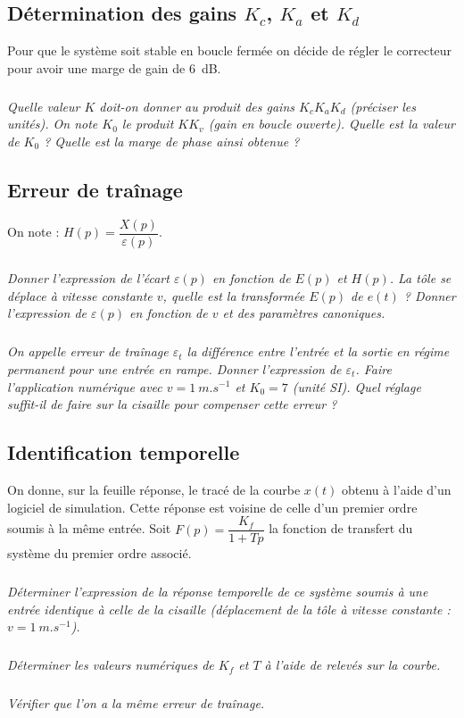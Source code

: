 \documentclass[10pt,fleqn]{article} %
\begin{document}
\begin{multicols}{2}
\subsection*{Détermination des gains $K_c$, $K_a$ et $K_d$}
Pour que le système soit stable en boucle fermée on décide de régler le correcteur pour avoir une marge de gain de \SI{6}{dB}.

\subparagraph{}\textit{Quelle valeur $K$ doit-on donner au produit des gains $K_c K_a K_d$ (préciser les unités).
On note $K_0$ le produit $KK_v$ (gain en boucle ouverte). Quelle est la valeur de $K_0$ ?
Quelle est la marge de phase ainsi obtenue ?}


\subsection*{Erreur de traînage}
On note :   $H(p)=\dfrac{X(p)}{\varepsilon(p)}$.

\subparagraph{}\textit{Donner l’expression de l’écart $\varepsilon(p)$ en fonction de $E(p)$ et $H(p)$. La tôle se déplace à vitesse constante $v$, quelle est la transformée $E(p)$ de $e(t)$ ? Donner l’expression de $\varepsilon(p)$ en fonction de $v$ et des paramètres canoniques.}

\subparagraph{}\textit{On appelle erreur de traînage $\varepsilon_t$ la différence entre l’entrée et la sortie en régime permanent pour une entrée en rampe. Donner l’expression de $\varepsilon_t$. Faire l’application numérique avec $v = \SI{1}{m.s^{-1}}$ et $K_0 = 7$ (unité SI).	
Quel réglage suffit-il de faire sur la cisaille pour compenser cette erreur ?}


\subsection*{Identification temporelle}
On donne, sur la feuille réponse, le tracé de la courbe $x(t)$ obtenu à l’aide d’un logiciel de simulation.
Cette réponse est voisine de celle d’un premier ordre soumis à la même entrée.
Soit $F(p)=\dfrac{K_f}{1+Tp}$ la fonction de transfert du système du premier ordre associé.

\subparagraph{}\textit{Déterminer l’expression de la réponse temporelle de ce système soumis à une entrée identique à celle de la cisaille (déplacement de la tôle à vitesse constante : $v = \SI{1}{m.s^{-1}}$).}

\subparagraph{}\textit{Déterminer les valeurs numériques de $K_f$ et $T$ à l’aide de relevés sur la courbe.}

\subparagraph{}\textit{Vérifier que l’on a la même erreur de traînage.}

\end{multicols}
\end{document}
